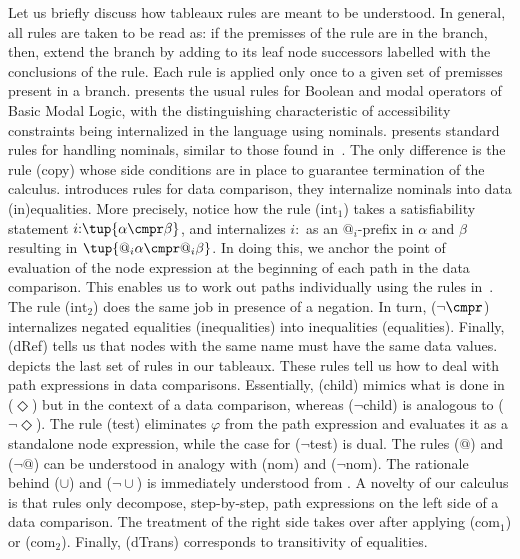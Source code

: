 \documentclass[10pt,a4paper]{amsart}
\theoremstyle{definition}
\theoremstyle{remark}
\begin{document}
Let us briefly discuss how tableaux rules are meant to be understood. 
In general, all rules are taken to be read as: if the premisses of the rule are in the branch, then, extend the branch by adding to its leaf node successors labelled with the conclusions of the rule. Each rule is applied only once to a given set of premisses present in a branch.
 presents the usual rules for Boolean and modal operators of Basic Modal Logic, with the distinguishing characteristic of accessibility constraints being internalized in the language using nominals.
 presents standard rules for handling nominals, similar to those found in~\cite{BolanderB07,Brauner2011}.
The only difference is the rule (copy) whose side conditions are in place to guarantee termination of the calculus. 
 introduces rules for data comparison, they internalize nominals into data (in)equalities.
More precisely, notice how the rule ($\mathrm{int}_1$) takes a satisfiability statement $i{:}\tup{\alpha \cmpr \beta}$, and internalizes $i{:}$ as an $@_i$-prefix in $\alpha$ and $\beta$ resulting in $\tup{@_i\alpha \cmpr @_i\beta}$. In doing this, we anchor the point of evaluation of the node expression at the beginning of each path in the data comparison.
This enables us to work out paths individually using the rules in~. The rule ($\mathrm{int}_2$) does the same job in presence of a negation. In turn, ($\neg{\cmpr}$) internalizes negated equalities (inequalities) into inequalities (equalities). 
Finally, (dRef) tells us that nodes with the same name must have the same data values.
 depicts the last set of rules in our tableaux.
These rules tell us how to deal with path expressions in data comparisons. 
Essentially, (child) mimics what is done in ($\Diamond$) but in the context of a data comparison, whereas ($\lnot$child) is analogous to (${\lnot}{\Diamond}$).
The rule (test) eliminates $\varphi$ from the path expression and evaluates it as a standalone node expression, while the case for ($\lnot$test) is dual. 
The rules ($@$) and (${\lnot}{@}$) can be understood in analogy with (nom) and (${\lnot}$nom).
The rationale behind ($\cup$) and (${\lnot}{\cup}$) is immediately understood from . 
A novelty of our calculus is that rules only decompose, step-by-step, path expressions on the left side of a data comparison.
The treatment of the right side takes over after applying ($\mathrm{com}_1$) or  ($\mathrm{com}_2$). 
Finally, (dTrans) corresponds to transitivity of equalities.
\end{document}

